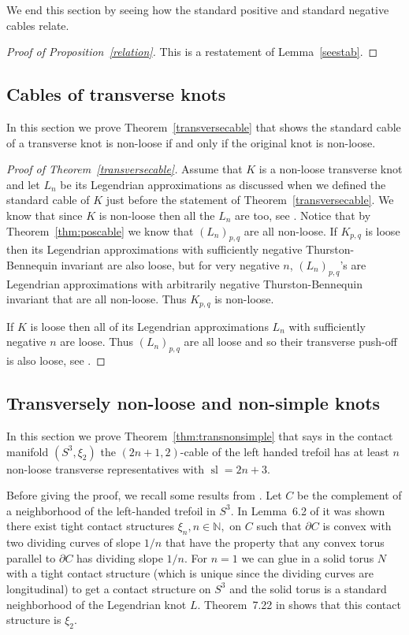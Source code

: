 \documentclass[11pt]{amsart}
\theoremstyle{plain}
\theoremstyle{definition}
\theoremstyle{remark}
\numberwithin{theorem}{section}
\newcommand{\N}{\mathbb{N}}           %
\DeclareMathOperator\self{sl}                 %
\begin{document}
We end this section by seeing how the standard positive and standard negative cables relate. 
\begin{proof}[Proof of Proposition~\ref{relation}]
This is a restatement of Lemma~\ref{seestab}.
\end{proof}

\subsection{Cables of transverse knots}
In this section we prove Theorem~\ref{transversecable} that shows the standard cable of a transverse knot is non-loose if and only if the original knot is non-loose.
\begin{proof}[Proof of Theorem~\ref{transversecable}]
Assume that $K$ is a non-loose transverse knot and let $L_n$ be its Legendrian approximations as discussed when we defined the standard cable of $K$ just before the statement of Theorem~\ref{transversecable}. We know that since $K$ is non-loose then all the $L_n$ are too, see \cite[Proposition~1.2]{Etnyre13}. Notice that by Theorem~\ref{thm:poscable} we know that $(L_n)_{p,q}$ are all non-loose. If $K_{p,q}$ is loose then its Legendrian approximations with sufficiently negative Thurston-Bennequin invariant are also loose, but for very negative $n$, $(L_n)_{p,q}$'s are Legendrian approximations with arbitrarily negative Thurston-Bennequin invariant that are all non-loose. Thus $K_{p,q}$ is non-loose.

If $K$ is loose then all of its Legendrian approximations $L_n$ with sufficiently negative $n$ are loose. Thus $(L_n)_{p,q}$ are all loose and so their transverse push-off is also loose, see \cite{Etnyre13}. 
\end{proof}

\subsection{Transversely non-loose and non-simple knots}
In this section we prove Theorem~\ref{thm:transnonsimple} that says in the contact manifold $(S^3,\xi_2)$ the $(2n+1,2)$-cable of the left handed trefoil has at least $n$ non-loose transverse representatives with $\self=2n+3$. 

Before giving the proof, we recall some results from \cite{EtnyreMinMukherjee22pre}. Let $C$ be the complement of a neighborhood of the left-handed trefoil in $S^3$. In Lemma~6.2 of \cite{EtnyreMinMukherjee22pre} it was shown there exist tight contact structures $\xi_n, n\in \N,$ on $C$ such that $\partial C$ is convex with two dividing curves of slope $1/n$ that have the property that any convex torus parallel to $\partial C$ has dividing slope $1/n$. For $n=1$ we can glue in a solid torus $N$ with a tight contact structure (which is unique since the dividing curves are longitudinal) to get a contact structure on $S^3$ and the solid torus is a standard neighborhood of the Legendrian knot $L$. Theorem~7.22 in \cite{EtnyreMinMukherjee22pre} shows that this contact structure is $\xi_2$.
\end{document}
